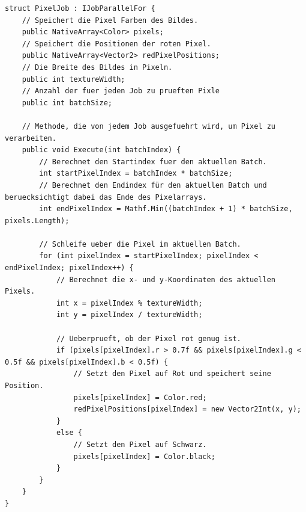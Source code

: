 \begin{lstlisting}[style=csharp, caption={Rote Pixel suche}, label=code:PixelJob]
struct PixelJob : IJobParallelFor {
    // Speichert die Pixel Farben des Bildes.
    public NativeArray<Color> pixels;
    // Speichert die Positionen der roten Pixel.
    public NativeArray<Vector2> redPixelPositions;
    // Die Breite des Bildes in Pixeln.
    public int textureWidth;
    // Anzahl der fuer jeden Job zu prueften Pixle
    public int batchSize;

    // Methode, die von jedem Job ausgefuehrt wird, um Pixel zu verarbeiten.
    public void Execute(int batchIndex) {
        // Berechnet den Startindex fuer den aktuellen Batch.
        int startPixelIndex = batchIndex * batchSize;
        // Berechnet den Endindex für den aktuellen Batch und beruecksichtigt dabei das Ende des Pixelarrays.
        int endPixelIndex = Mathf.Min((batchIndex + 1) * batchSize, pixels.Length);

        // Schleife ueber die Pixel im aktuellen Batch.
        for (int pixelIndex = startPixelIndex; pixelIndex < endPixelIndex; pixelIndex++) {
            // Berechnet die x- und y-Koordinaten des aktuellen Pixels.
            int x = pixelIndex % textureWidth;
            int y = pixelIndex / textureWidth;

            // Ueberprueft, ob der Pixel rot genug ist.
            if (pixels[pixelIndex].r > 0.7f && pixels[pixelIndex].g < 0.5f && pixels[pixelIndex].b < 0.5f) {
                // Setzt den Pixel auf Rot und speichert seine Position.
                pixels[pixelIndex] = Color.red;
                redPixelPositions[pixelIndex] = new Vector2Int(x, y);
            }
            else {
                // Setzt den Pixel auf Schwarz.
                pixels[pixelIndex] = Color.black;
            }
        }
    }
}

\end{lstlisting}
